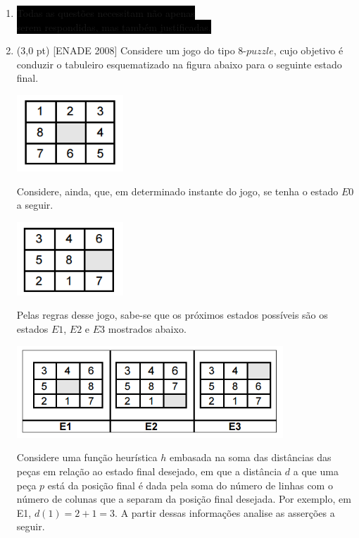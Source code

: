 \documentclass[12pt,a4paper,oneside]{article}
\begin{document}
\begin{enumerate}
	
	\item[] \colorbox{black}{
		\color{white}Todas as questões necessitam não apenas
	}\\ 
	\colorbox{black}{
		\color{white} serem respondidas, mas também justificadas.
	}

		\item (3,0 pt) [ENADE 2008] Considere um jogo do tipo 8-$puzzle$, cujo objetivo é conduzir o tabuleiro esquematizado na figura abaixo para o seguinte estado final. 
	
	\begin{center}
		\includegraphics[width=4cm]{images/enade01.png}
	\end{center}
	
	Considere, ainda, que, em determinado instante do jogo, se tenha o estado $E0$ a seguir.
	
	\begin{center}
		\includegraphics[width=4cm]{images/enade02.png}
	\end{center}
	
	Pelas regras desse jogo, sabe-se que os próximos estados possíveis são os estados $E1$, $E2$ e $E3$ mostrados abaixo.
	
	\begin{center}
		\includegraphics[width=10cm]{images/enade03.png}
	\end{center}
	
	Considere uma função heurística $h$ embasada na soma das distâncias das peças em relação ao estado final desejado,
	em que a distância $d$ a que uma peça $p$ está da posição final é dada pela soma do número de linhas com o número de colunas que a separam da posição final desejada. Por exemplo, em E1, $d(1) = 2 + 1 = 3$. A partir dessas informações analise as asserções a seguir.
	

\end{enumerate}
\end{document}
